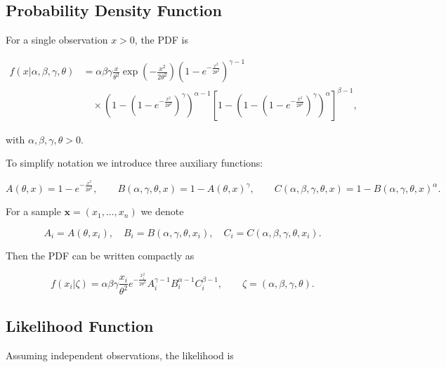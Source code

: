 \documentclass[12pt]{article}
\begin{document}
\subsection{Probability Density Function}



For a single observation \(x > 0\), the PDF is



\[
\begin{aligned}
f(x|\alpha,\beta,\gamma,\theta)
&= \alpha\beta\gamma \frac{x}{\theta^2}
\exp\left(-\frac{x^2}{2\theta^2}\right)
\left(1-e^{-\frac{x^2}{2\theta^2}}\right)^{\gamma-1} \\
&\quad\times \left(1-\left(1-e^{-\frac{x^2}{2\theta^2}}\right)^{\gamma}\right)^{\alpha-1}
\left[1-\left(1-\left(1-e^{-\frac{x^2}{2\theta^2}}\right)^{\gamma}\right)^{\alpha}\right]^{\beta-1},
\end{aligned}
\]



with \(\alpha,\beta,\gamma,\theta > 0\).



To simplify notation we introduce three auxiliary functions:



\[
A(\theta,x) = 1-e^{-\frac{x^2}{2\theta^2}},\qquad
B(\alpha,\gamma,\theta,x) = 1 - A(\theta,x)^{\gamma},\qquad
C(\alpha,\beta,\gamma,\theta,x) = 1 - B(\alpha,\gamma,\theta,x)^{\alpha}.
\]



For a sample \(\mathbf{x} = (x_1,\dots,x_n)\) we denote



\[
A_i = A(\theta,x_i),\quad B_i = B(\alpha,\gamma,\theta,x_i),\quad C_i = C(\alpha,\beta,\gamma,\theta,x_i).
\]



Then the PDF can be written compactly as



\[
f(x_i|\zeta) = \alpha\beta\gamma \frac{x_i}{\theta^2}
e^{-\frac{x_i^2}{2\theta^2}} A_i^{\gamma-1} B_i^{\alpha-1} C_i^{\beta-1},
\qquad \zeta = (\alpha,\beta,\gamma,\theta).
\]



\subsection{Likelihood Function}



Assuming independent observations, the likelihood is
\end{document}
